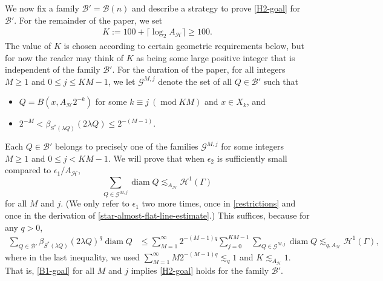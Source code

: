 \documentclass[12pt]{amsart}
\numberwithin{equation}{section}
\theoremstyle{plain}
\theoremstyle{definition}
\newcommand{\diam}{\mathop\mathrm{diam}\nolimits}
\newcommand{\Mod}{\operatorname{mod}}
\newcommand{\Haus}{\mathcal{H}}
\newcommand{\flatepsilon}{\epsilon_2}
\numberwithin{figure}{section}
\begin{document}
We now fix a family $\mathscr{B}'=\mathscr{B}(n)$ and describe a strategy to prove \eqref{H2-goal} for $\mathscr{B}'$. For the remainder of the paper, we set \begin{align}\label{K def}
    K:=100+\lceil \log_2 A_\mathscr{H}\rceil\geq 100.
\end{align} The value of $K$ is chosen according to certain geometric requirements below, but for now the reader may think of $K$ as being some large positive integer that is independent of the family $\mathscr{B}'$.
For the duration of the paper, for all integers $M\geq 1$ and $0\leq j\leq KM-1$, we let $\mathscr{G}^{M,j}$ denote the set of all $Q\in\mathscr{B}'$ such that \begin{itemize}
\item $Q=B(x,A_\mathscr{H}2^{-k})$ for some $k\equiv j\ (\Mod KM)$ and $x\in X_k$, and
\item $2^{-M}<\beta_{S^*(\lambda Q)}(2\lambda Q)\leq 2^{-(M-1)}$.
\end{itemize} Each $Q\in\mathscr{B}'$ belongs to precisely one of the families $\mathscr{G}^{M,j}$ for some integers $M\geq 1$ and $0\leq j<KM-1$. We will prove that when $\flatepsilon$ is sufficiently small compared to $\epsilon_1/A_\mathscr{H}$,   \begin{equation}\label{B1-goal} \sum_{Q\in\mathscr{G}^{M,j}} \diam Q \lesssim_{A_\mathscr{H}} \Haus^1(\Gamma)\end{equation} for all $M$ and $j$. (We only refer to $\epsilon_1$ two more times, once in \eqref{restrictions} and once in the derivation of  \eqref{star-almost-flat-line-estimate}.) This suffices, because for any $q>0$, \begin{align*} \sum_{Q\in\mathscr{B}'} \beta_{S^*(\lambda Q)}(2\lambda Q)^q\diam Q &\leq \sum_{M=1}^\infty 2^{-(M-1)q}\sum_{j=0}^{KM-1} \sum_{Q\in\mathscr{G}^{M,j}}\diam Q\lesssim_{q,A_\mathscr{H}} \Haus^1(\Gamma),\end{align*} where in the last inequality, we used $\sum_{M=1}^\infty M2^{-(M-1)q}\lesssim_q 1$ and $K\lesssim_{A_\mathscr{H}} 1$. That is, \eqref{B1-goal} for all $M$ and $j$ implies \eqref{H2-goal} holds for the family $\mathscr{B}'$.
\end{document}
